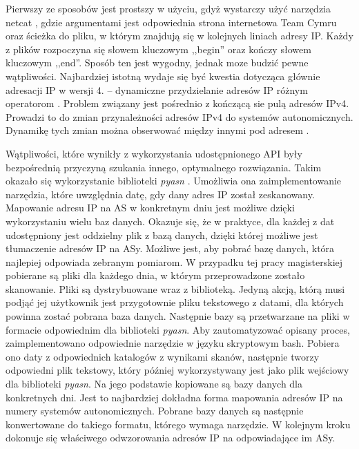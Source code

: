 Pierwszy ze sposobów jest prostszy w użyciu, gdyż wystarczy użyć narzędzia netcat \cite{netcat}, gdzie argumentami jest odpowiednia
strona internetowa Team Cymru \cite{cymru} oraz ścieżka do pliku, w którym znajdują się w kolejnych liniach adresy IP. Każdy z plików
rozpoczyna się słowem kluczowym ,,begin'' oraz kończy słowem kluczowym ,,end''. Sposób ten jest wygodny, jednak moze budzić pewne
wątpliwości. Najbardziej istotną wydaje się być kwestia dotycząca głównie adresacji IP w wersji 4. -- dynamiczne przydzielanie adresów
IP różnym operatorom \cite{RFC2050}. Problem związany jest pośrednio z kończącą sie pulą adresów IPv4. Prowadzi to do zmian przynależności
adresów IPv4 do systemów autonomicznych. Dynamikę tych zmian można obserwować między innymi pod adresem \cite{cidr_report}.

Wątpliwości, które wynikły z wykorzystania udostępnionego API były bezpośrednią przyczyną szukania innego, optymalnego rozwiązania.
Takim okazało się wykorzystanie biblioteki \textit{pyasn} \cite{pyasn}. Umożliwia ona zaimplementowanie narzędzia, które uwzględnia
datę, gdy dany adres IP został zeskanowany. Mapowanie adresu IP na AS w konkretnym dniu jest możliwe dzięki wykorzystaniu wielu baz
danych. Okazuje się, że w praktyce, dla każdej z dat udostępniony jest oddzielny plik z bazą danych, dzięki której możliwe jest
tłumaczenie adresów IP na ASy. Możliwe jest, aby pobrać bazę danych, która najlepiej odpowiada zebranym pomiarom. W przypadku tej
pracy magisterskiej pobierane są pliki dla każdego dnia, w którym przeprowadzone zostało skanowanie. Pliki są dystrybuowane wraz z
biblioteką. Jedyną akcją, którą musi podjąć jej użytkownik jest przygotownie pliku tekstowego z datami, dla których powinna zostać
pobrana baza danych. Następnie bazy są przetwarzane na pliki w formacie odpowiednim dla biblioteki \textit{pyasn}. Aby zautomatyzować
opisany proces, zaimplementowano odpowiednie narzędzie w języku skryptowym bash. Pobiera ono daty z odpowiednich katalogów z wynikami
skanów, następnie tworzy odpowiedni plik tekstowy, który później wykorzystywany jest jako plik wejściowy dla biblioteki \textit{pyasn}.
Na jego podstawie kopiowane są bazy danych dla konkretnych dni. Jest to najbardziej dokładna forma mapowania adresów IP na numery
systemów autonomicznych. Pobrane bazy danych są następnie konwertowane do takiego formatu, którego wymaga narzędzie. W kolejnym kroku
dokonuje się właściwego odwzorowania adresów IP na odpowiadające im ASy.

